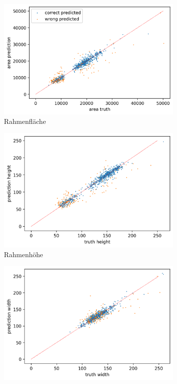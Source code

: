 	\begin{figure}[h]
		\centering
		\begin{subfigure}[c]{0.32\textwidth}			
			\includegraphics[width=1\textwidth,center]{bilder/Hauptteil/MT_Grapple/Fehler/AreaBB.png}
			\caption{Rahmenfläche}
			\label{img:Rahmenflaeche}	
		\end{subfigure}
		\begin{subfigure}[c]{0.32\textwidth}			
			\includegraphics[width=1\textwidth, center]{bilder/Hauptteil/MT_Grapple/Fehler/HeightBB.png}
			\caption{Rahmenhöhe}
			\label{img:Rahmenhoehe}	
		\end{subfigure}
		\begin{subfigure}[c]{0.32\textwidth}			
			\includegraphics[width=1\textwidth, center]{bilder/Hauptteil/MT_Grapple/Fehler/WidthBB.png}

\end{subfigure}
\end{figure}
